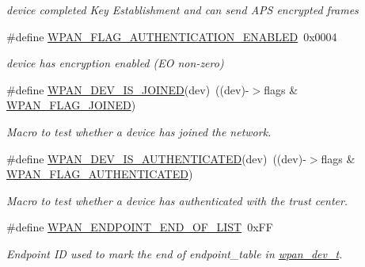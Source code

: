 \begin{DoxyCompactItemize}
\begin{DoxyCompactList}\small\item\em device completed Key Establishment and can send A\+PS encrypted frames \end{DoxyCompactList}\item 
\mbox{\label{group__wpan__aps_gab7d95fae8b625fd39ae3b6f168a5511f}} 
\#define \hyperlink{group__wpan__aps_gab7d95fae8b625fd39ae3b6f168a5511f}{W\+P\+A\+N\+\_\+\+F\+L\+A\+G\+\_\+\+A\+U\+T\+H\+E\+N\+T\+I\+C\+A\+T\+I\+O\+N\+\_\+\+E\+N\+A\+B\+L\+ED}~0x0004
\begin{DoxyCompactList}\small\item\em device has encryption enabled (EO non-\/zero) \end{DoxyCompactList}\item 
\#define \hyperlink{group__wpan__aps_gabe1e612e16ea40f970a7f160cae6de3a}{W\+P\+A\+N\+\_\+\+D\+E\+V\+\_\+\+I\+S\+\_\+\+J\+O\+I\+N\+ED}(dev)~((dev)-\/$>$flags \& \hyperlink{group__wpan__aps_gaa06c0d38b4a130f9657abf26c73b49dd}{W\+P\+A\+N\+\_\+\+F\+L\+A\+G\+\_\+\+J\+O\+I\+N\+ED})
\begin{DoxyCompactList}\small\item\em Macro to test whether a device has joined the network. \end{DoxyCompactList}\item 
\#define \hyperlink{group__wpan__aps_ga5ba1c4d72eeac9bb8bd97ee811d7aa05}{W\+P\+A\+N\+\_\+\+D\+E\+V\+\_\+\+I\+S\+\_\+\+A\+U\+T\+H\+E\+N\+T\+I\+C\+A\+T\+ED}(dev)~((dev)-\/$>$flags \& \hyperlink{group__wpan__aps_ga6508b417838fc0a043f5570b65e3f24b}{W\+P\+A\+N\+\_\+\+F\+L\+A\+G\+\_\+\+A\+U\+T\+H\+E\+N\+T\+I\+C\+A\+T\+ED})
\begin{DoxyCompactList}\small\item\em Macro to test whether a device has authenticated with the trust center. \end{DoxyCompactList}\item 
\mbox{\label{group__wpan__aps_ga0ca55f0e8039df7fba03c041e4cf5a79}} 
\#define \hyperlink{group__wpan__aps_ga0ca55f0e8039df7fba03c041e4cf5a79}{W\+P\+A\+N\+\_\+\+E\+N\+D\+P\+O\+I\+N\+T\+\_\+\+E\+N\+D\+\_\+\+O\+F\+\_\+\+L\+I\+ST}~0x\+FF
\begin{DoxyCompactList}\small\item\em Endpoint ID used to mark the end of {\ttfamily endpoint\+\_\+table} in \hyperlink{structwpan__dev__t}{wpan\+\_\+dev\+\_\+t}. \end{DoxyCompactList}\item 

\end{DoxyCompactItemize}
